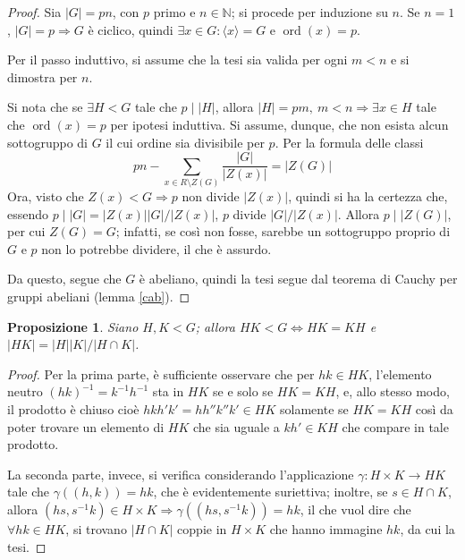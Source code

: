 \documentclass[11pt]{article}
\theoremstyle{style}
\newtheorem{prop}{Proposizione}[section]
\numberwithin{equation}{subsection}
\begin{document}
	\begin{proof}
		Sia $|G| = pn$, con $p$ primo e $n \in \mathbb{N}$; si procede per induzione su $n$.
		Se $n=1$, $|G| = p \Rightarrow G$ \`e ciclico, quindi $\exists x \in G : \langle x \rangle=G$ e $\operatorname{ord}(x) = p$.

		Per il passo induttivo, si assume che la tesi sia valida per ogni $ m < n$ e si dimostra per $n$.

Si nota che se $\exists  H < G$ tale che $p  \mid  \lvert H \rvert $, allora $|H|=pm , \ m < n \Rightarrow \exists x \in H$ tale che $\operatorname{ord}(x) =p$ per ipotesi induttiva.
Si assume, dunque, che non esista alcun sottogruppo di $G$ il cui ordine sia divisibile per $p$.
Per la formula delle classi
\[
pn - \sum_{x \in R\setminus Z(G)}^{} \frac{\lvert G \rvert }{|Z(x)|} = \lvert Z(G) \rvert 
\] 
Ora, visto che $Z(x) < G \Rightarrow p$ non divide $|Z(x)|$, quindi si ha la certezza che, essendo $p  \mid |G| = |Z(x)| |G|/|Z(x)|$, $p$ divide $|G|/|Z(x)|$. 
Allora $p  \mid  |Z(G)|$, per cui $Z(G) =G$; infatti, se cos\`i non fosse, sarebbe un sottogruppo proprio di $G$ e $p$ non lo potrebbe dividere, il che \`e assurdo.

Da questo, segue che $G$ \`e abeliano, quindi la tesi segue dal teorema di Cauchy per gruppi abeliani (lemma \ref{cab}).
	\end{proof}
\begin{prop}\label{tgen}
Siano $H,K < G$; allora $HK < G \iff HK = KH$ e $\lvert HK \rvert = \lvert H \rvert \lvert K \rvert / \lvert H \cap K \rvert $.
\end{prop}
\begin{proof}
Per la prima parte, \`e sufficiente osservare che per $hk \in HK$, l'elemento neutro $(hk)^{-1} = k^{-1} h^{-1} $ sta in $HK$ se e solo se $HK = KH$, e, allo stesso modo, il prodotto \`e chiuso cio\`e $hkh'k' = hh''k''k' \in HK$ solamente se $HK = KH$ cos\`i da poter trovare un elemento di $HK$ che sia uguale a $kh'\in KH$ che compare in tale prodotto.

La seconda parte, invece, si verifica considerando l'applicazione $\gamma: H \times K\to HK$ tale che $\gamma((h,k)) = hk$, che \`e evidentemente suriettiva; inoltre, se $s \in H \cap K$, allora $(hs,s^{-1}k) \in H \times K\Rightarrow \gamma ((hs,s^{-1}k)) = hk$, il che vuol dire che $\forall hk \in HK$, si trovano $|H\cap K|$ coppie in $H \times K$ che hanno immagine $hk$, da cui la tesi.
\end{proof}
\end{document}
